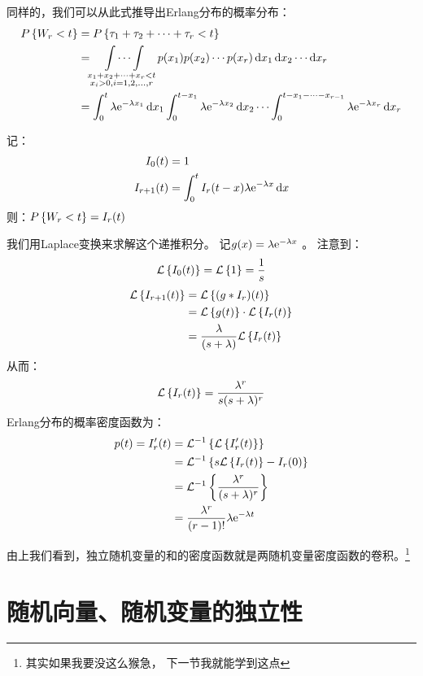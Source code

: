 同样的，我们可以从此式推导出Erlang分布的概率分布：
\begin{align*}
    \P{W_{r}<t} &= \P{\tau_{1}+\tau_{2}+\cdots+\tau_{r}<t} \\
    &= \idotsint\limits_{\substack{x_{1}+x_{2}+\dots +x_{r}<t
    \\ x_{i}>0, i=1,2,\ldots,r}} p(x_{1}) p(x_{2}) \cdots p(x_{r})
    \d{x}_{1} \d{x}_{2} \cdots \d{x}_{r} \\
    &=\int_{0}^{t} \lambda \e^{-\lambda x_{1}} \d{x_{1}}
    \int_{0}^{t-x_{1}} \lambda \e^{-\lambda x_{2}} \d{x_{2}} \cdots
    \int_{0}^{t-x_{1}-\cdots-x_{r-1}} \lambda \e^{-\lambda
    x_{r}} \d{x_{r}} \\
\end{align*}

记：
\begin{align*}
    I_{0}(t) &= 1\\
    I_{r+1}(t) &= \int_{0}^{t} I_{r}(t-x) \lambda \e^{-\lambda x} \d{x}
    \end{align*}
则：\(\P{W_{r}<t} = I_{r}(t)\)

我们用Laplace变换来求解这个递推积分。
记\(g(x) = \lambda \e^{-\lambda x} \) 。
注意到：
\[
    \L{I_{0}(t)} = \L{1} = \frac{1}{s} \\
\]
\begin{align*}
    \L{I_{r+1}(t)} &= \L{(g * I_{r})(t)} \\
    &= \L{g(t)} \cdot \L{I_{r}(t)} \\
    &= \frac{\lambda}{(s+\lambda)} \L{I_{r}(t)}\\
\end{align*}
从而：\[
    \L{I_{r}(t)} = \frac{\lambda^{r}}{s(s+\lambda)^{r}} \\
\]
Erlang分布的概率密度函数为：
\begin{align*}
    p(t) = I_{r}'(t) &= \invL{\L{I_{r}'(t)}} \\
    &= \invL{s\L{I_{r}(t)} - I_{r}(0)} \\
    &= \invL{\frac{\lambda^{r}}{(s+\lambda)^{r}}} \\
    &= \frac{\lambda^{r}}{(r-1)!} \lambda \e^{-\lambda t} \\
\end{align*}

由上我们看到，独立随机变量的和的密度函数就是两随机变量密度函数的卷积。\footnote{其实如果我要没这么猴急，
下一节我就能学到这点}

\section{随机向量、随机变量的独立性}
